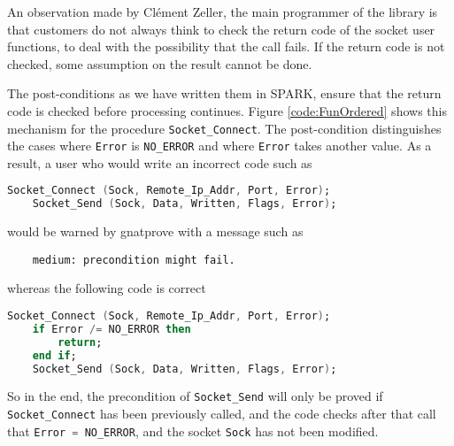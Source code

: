 \documentclass[a4paper, 10pt]{article}
\begin{document}
    An observation made by Clément Zeller, the main programmer of the library is that customers
    do not always think to check the return code of the socket user functions, to deal with the
    possibility that the call fails.
    If the return code is not checked, some assumption on the result cannot be done.

    The post-conditions as we have written them in SPARK, ensure that the return code is checked
    before processing continues. Figure \ref{code:FunOrdered} shows this mechanism for the
    procedure \lstinline[language=Ada]{Socket_Connect}. The post-condition distinguishes the cases
    where \lstinline{Error} is \lstinline{NO_ERROR} and where \lstinline{Error} takes another value.
    As a result, a user who would write an incorrect code such as
    \begin{lstlisting}[language=Ada]
    Socket_Connect (Sock, Remote_Ip_Addr, Port, Error);
    Socket_Send (Sock, Data, Written, Flags, Error);
    \end{lstlisting}
    would be warned by gnatprove with a message such as
    \begin{verbatim}
    medium: precondition might fail.
    \end{verbatim}
    whereas the following code is correct
    \begin{lstlisting}[language=Ada]
    Socket_Connect (Sock, Remote_Ip_Addr, Port, Error);
    if Error /= NO_ERROR then
        return;
    end if;
    Socket_Send (Sock, Data, Written, Flags, Error);
    \end{lstlisting}

    So in the end, the precondition of \lstinline[language=Ada]{Socket_Send} will only
    be proved if \lstinline[language=Ada]{Socket_Connect} has been previously called, and the code
    checks after that call that \lstinline[language=Ada]{Error = NO_ERROR}, and the socket
    \lstinline[language=Ada]{Sock} has not been modified.


\end{document}
